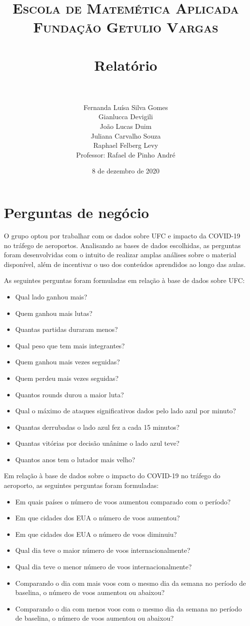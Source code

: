 \documentclass{article}
\title{	
\normalfont \normalsize 
\textsc{Escola de Matemética Aplicada} \\
\textsc{Fundação Getulio Vargas}\\ [25pt] 
\horrule{0.5pt} \\[0.4cm] 
\huge Relatório \\ 
\horrule{2pt} \\[0.5cm] 
}
\author{Fernanda Luísa Silva Gomes \\ Gianlucca Devigili \\ João Lucas Duim\\ Juliana Carvalho Souza \\ Raphael Felberg Levy\\[0.1cm]{Professor: Rafael de Pinho André}}
\date{8 de dezembro de 2020}
\begin{document}
\maketitle

\section{Perguntas de negócio}
O grupo optou por trabalhar com os dados sobre UFC e impacto da COVID-19 no tráfego de aeroportos. Analisando as bases de dados escolhidas, as perguntas foram desenvolvidas com o intuito de realizar amplas análises sobre o material disponível, além de incentivar o uso dos conteúdos aprendidos ao longo das aulas. 
\par As seguintes perguntas foram formuladas em relação à base de dados sobre UFC:
\begin{itemize}
    \item Qual lado ganhou mais?
    \item Quem ganhou mais lutas?
    \item Quantas partidas duraram menos?
    \item Qual peso que tem mais integrantes?
    \item Quem ganhou mais vezes seguidas?
    \item Quem perdeu mais vezes seguidas?
    \item Quantos rounds durou a maior luta?
    \item Qual o máximo de ataques significativos dados pelo lado azul por minuto? 
    \item Quantas derrubadas o lado azul fez a cada 15 minutos?
    \item Quantas vitórias por decisão unânime o lado azul teve? 
    \item Quantos anos tem o lutador mais velho? 
\end{itemize}

\par Em relação à base de dados sobre o impacto do COVID-19 no tráfego do aeroporto, as seguintes perguntas foram formuladas:
\begin{itemize}
    \item Em quais países o número de voos aumentou comparado com o período?
    \item Em que cidades dos EUA o número de voos aumentou?
    \item Em que cidades dos EUA o número de voos diminuiu?
    \item Qual dia teve o maior número de voos internacionalmente?
    \item Qual dia teve o menor número de voos internacionalmente?
    \item Comparando o dia com mais voos com o mesmo dia da semana no período de baselina, o número de voos aumentou ou abaixou?
    \item Comparando o dia com menos voos com o mesmo dia da semana no período de baselina, o número de voos aumentou ou abaixou?
\end{itemize}
\end{document}
